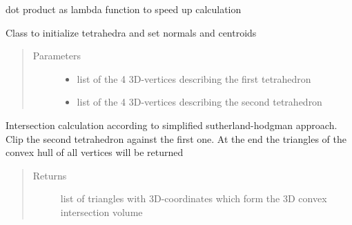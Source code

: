 \documentclass[letterpaper,10pt,english]{sphinxmanual}
\begin{document}
\begin{fulllineitems}
\label{\detokenize{pk_src.intersection_tet_tet:pk_src.intersection_tet_tet.dot}}
dot product as lambda function to speed up calculation

\end{fulllineitems}


\begin{fulllineitems}
\label{\detokenize{pk_src.intersection_tet_tet:pk_src.intersection_tet_tet.intersection_tet_tet}}
Class to initialize tetrahedra and set normals and centroids
\begin{quote}\begin{description}
\item[{Parameters}] \leavevmode\begin{itemize}
\item {} 
 \textendash{} list of the 4 3D-vertices describing the first tetrahedron

\item {} 
 \textendash{} list of the 4 3D-vertices describing the second tetrahedron

\end{itemize}

\end{description}\end{quote}

\begin{fulllineitems}
\label{\detokenize{pk_src.intersection_tet_tet:pk_src.intersection_tet_tet.intersection_tet_tet.intersect}}
Intersection calculation according to simplified sutherland-hodgman approach. Clip the second tetrahedron against the first one. At the end the triangles of the convex hull of all vertices will be returned
\begin{quote}\begin{description}
\item[{Returns}] \leavevmode
list of triangles with 3D-coordinates which form the 3D convex intersection volume


\end{description}
\end{quote}
\end{fulllineitems}
\end{fulllineitems}
\end{document}
